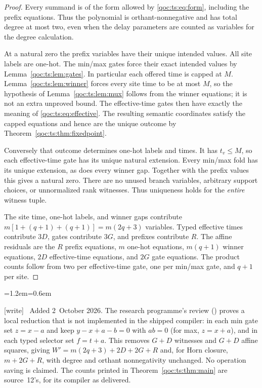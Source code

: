 \documentclass[11pt,letterpaper]{article}
\theoremstyle{definition}
\theoremstyle{remark}
\newcommand{\wtag}{\textup{[write]}}
\newenvironment{writenote}{\par\smallskip\begin{list}{}{\leftmargin=1.2em\rightmargin=0.6em}\item[]\small\wtag\ }{\end{list}\smallskip}
\begin{document}
\begin{proof}
Every summand is of the form allowed by \eqref{qoc:ts:eq:form}, including the
prefix equations. Thus the polynomial is orthant-nonnegative and has
total degree at most two, even when the delay parameters are counted as
variables for the degree calculation.

At a natural zero the prefix variables have their unique intended values.
All site labels are one-hot. The min/max gates force their exact intended
values by Lemma~\ref{qoc:ts:lem:gates}. In particular each offered time is capped
at $M$. Lemma~\ref{qoc:ts:lem:winner} forces every site time to be at most $M$,
so the hypothesis of Lemma~\ref{qoc:ts:lem:mux} follows from the winner equations;
it is not an extra unproved bound. The effective-time gates then have
exactly the meaning of \eqref{qoc:ts:eq:effective}. The resulting semantic
coordinates satisfy the capped equations and hence are the unique outcome
by Theorem~\ref{qoc:ts:thm:fixedpoint}.

Conversely that outcome determines one-hot labels and times. It has
$t_v\le M$, so each effective-time gate has its unique natural extension.
Every min/max fold has its unique extension, as does every winner gap.
Together with the prefix values this gives a natural zero. There are no
unused branch variables, arbitrary support choices, or unnormalized
rank witnesses. Thus uniqueness holds for the \emph{entire} witness tuple.

The site time, one-hot labels, and winner gaps contribute
$m[1+(q+1)+(q+1)]=m(2q+3)$ variables. Typed effective times contribute
$3D$, gates contribute $3G$, and prefixes contribute $R$. The affine
residuals are the $R$ prefix equations, $m$ one-hot equations,
$m(q+1)$ winner equations, $2D$ effective-time equations, and $2G$
gate equations. The product counts follow from two per effective-time
gate, one per min/max gate, and $q+1$ per site.
\end{proof}

\begin{writenote}
Added 2~October 2026. The research programme's review () proves a local reduction that is not implemented in the shipped compiler: in each min gate set $z=x-a$ and keep $y-x+a-b=0$ with $ab=0$ (for max, $z=x+a$), and in each typed selector set $f=t+a$. This removes $G+D$ witnesses and $G+D$ affine squares, giving $W'=m(2q+3)+2D+2G+R$ and, for Horn closure, $m+2G+R$, with degree and orthant nonnegativity unchanged. No operation saving is claimed. The counts printed in Theorem~\ref{qoc:ts:thm:main} are source~12's, for its compiler as delivered.
\end{writenote}
\end{document}
